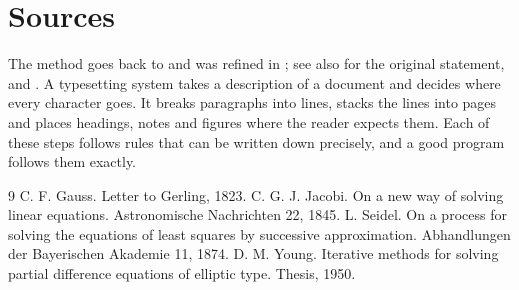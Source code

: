 \documentclass{article}
\begin{document}
\section{Sources}
The method goes back to \cite{gauss} and was refined in \cite{jacobi,seidel}; see also
\cite[p.~12]{gauss} for the original statement, and \cite[Chapter~3]{seidel,young}.
A typesetting system takes a description of a document and decides where every character goes. It breaks paragraphs into lines, stacks the lines into pages and places headings, notes and figures where the reader expects them. Each of these steps follows rules that can be written down precisely, and a good program follows them exactly.
\begin{thebibliography}{9}
 C. F. Gauss. Letter to Gerling, 1823.
 C. G. J. Jacobi. On a new way of solving linear equations. Astronomische Nachrichten 22, 1845.
 L. Seidel. On a process for solving the equations of least squares by successive approximation. Abhandlungen der Bayerischen Akademie 11, 1874.
 D. M. Young. Iterative methods for solving partial difference equations of elliptic type. Thesis, 1950.
\end{thebibliography}
\end{document}
